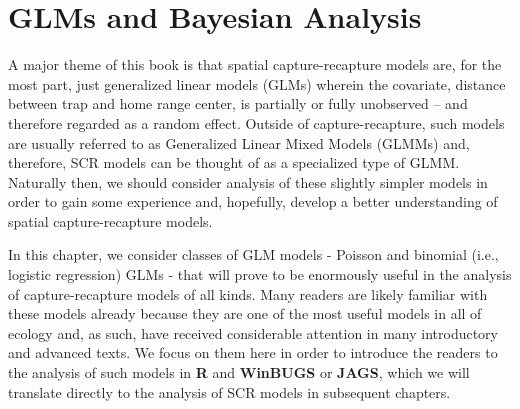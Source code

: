 \chapter{
 GLMs and Bayesian Analysis
}
\label{chapt.glms}

\vspace{.3in}




A major theme of this book is that spatial capture-recapture models
are, for the most part, just generalized linear models (GLMs) wherein
the covariate, distance between trap and home range center, is
partially or fully unobserved  -- and therefore regarded as
a random effect. Outside of capture-recapture, such models
are usually referred to as Generalized Linear Mixed Models (GLMMs)
and, therefore, SCR models can be thought of as a specialized type of
GLMM. Naturally then, we should consider analysis of these slightly
simpler models in order to gain some experience and, hopefully,
develop a better understanding of spatial capture-recapture models.

In this chapter, we consider classes of GLM models - Poisson and
binomial (i.e., logistic regression) GLMs - that will prove to be
enormously useful in the analysis of capture-recapture models of all
kinds. Many readers are likely familiar with these models already because
they are one of
the most useful models in all of ecology and, as
such, have received considerable attention in many introductory and
advanced texts. We focus on them here in order to introduce the
readers to the analysis of such models in {\bf R} and {\bf WinBUGS} or
{\bf JAGS},
which we will
translate directly to the analysis of SCR models in subsequent
chapters.

